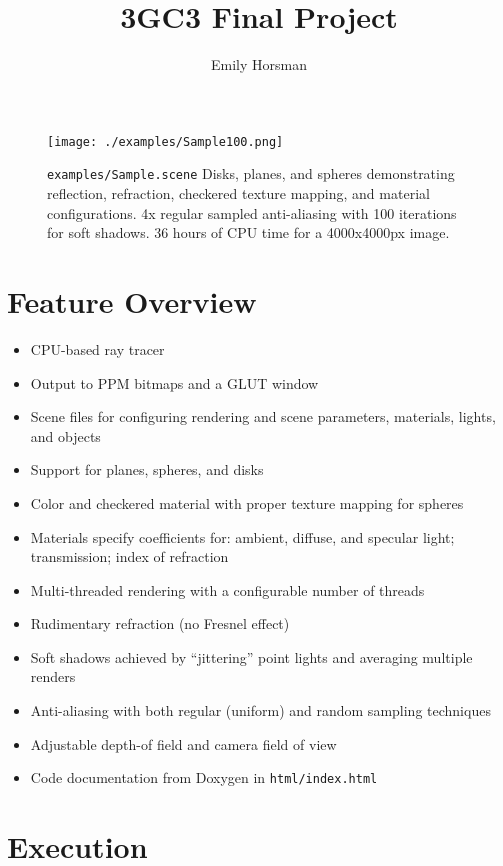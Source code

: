 \documentclass{article}
\title{3GC3 Final Project}
\author{Emily Horsman}
\date{}
\begin{document}
\maketitle

\begin{figure}[H]
    \texttt{[image: ./examples/Sample100.png]}
    \caption{\texttt{examples/Sample.scene} Disks, planes, and spheres demonstrating reflection, refraction, checkered texture mapping, and material configurations. 4x regular sampled anti-aliasing with 100 iterations for soft shadows. 36 hours of CPU time for a 4000x4000px image.}
    \label{fig:title}
\end{figure}

\newpage
\tableofcontents

\section{Feature Overview}

\begin{itemize}
    \item CPU-based ray tracer
    \item Output to PPM bitmaps and a GLUT window
    \item Scene files for configuring rendering and scene parameters, materials, lights, and objects
    \item Support for planes, spheres, and disks
    \item Color and checkered material with proper texture mapping for spheres
    \item Materials specify coefficients for: ambient, diffuse, and specular light; transmission; index of refraction
    \item Multi-threaded rendering with a configurable number of threads
    \item Rudimentary refraction (no Fresnel effect)
    \item Soft shadows achieved by ``jittering'' point lights and averaging multiple renders
    \item Anti-aliasing with both regular (uniform) and random sampling techniques
    \item Adjustable depth-of field and camera field of view
    \item Code documentation from Doxygen in \texttt{html/index.html}
\end{itemize}

\section{Execution}
\end{document}
